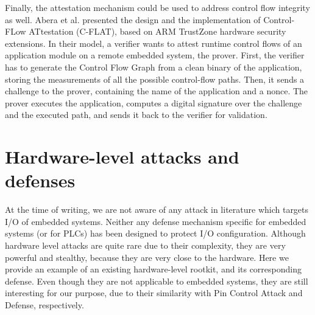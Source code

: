 Finally, the attestation mechanism could be used to address control flow integrity as well.
Abera et al. \cite{cflat} presented the design and the implementation of Control-FLow ATtestation (C-FLAT), based on ARM TrustZone hardware security extensions.
In their model, a verifier wants to attest runtime control flows of an application module on a remote embedded system, the prover.
First, the verifier has to generate the Control Flow Graph from a clean binary of the application, storing the measurements of all the possible control-flow paths.
Then, it sends a challenge to the prover, containing the name of the application and a nonce. The prover executes the application, computes a digital signature
over the challenge and the executed path, and sends it back to the verifier for validation.


\section{Hardware-level attacks and defenses}

At the time of writing, we are not aware of any attack in literature which targets I/O of embedded systems.
Neither any defense mechanism specific for embedded systems (or for PLCs) has been designed to protect I/O configuration.
Although hardware level attacks are quite rare due to their complexity, they are very powerful and stealthy, because they are very close to the hardware.
Here we provide an example of an existing hardware-level rootkit, and its corresponding defense. Even though they are not applicable to embedded systems,
they are still interesting for our purpose, due to their similarity with Pin Control Attack and Defense, respectively.

